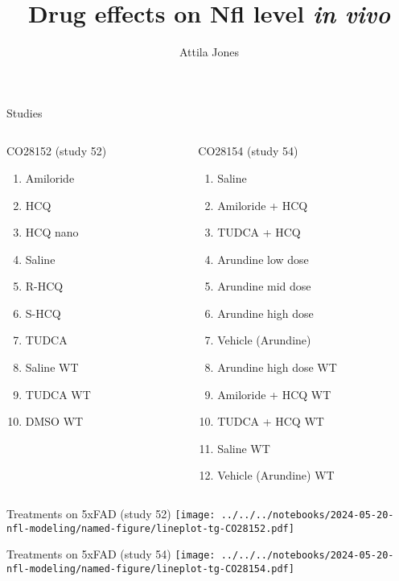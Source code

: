 \documentclass[aspectratio=169]{beamer}
\title{Drug effects on Nfl level \emph{in vivo}}
\subtitle{}
\author{Attila Jones}
\date{}
\begin{document}
\titlepage

\begin{frame}{Studies}
\begin{columns}[t]
\begin{column}{0.5\textwidth}
  CO28152 (study 52)
\begin{enumerate}
      \item Amiloride
      \item HCQ
      \item HCQ nano
      \item Saline
      \item R-HCQ
      \item S-HCQ
      \item TUDCA
      \item Saline WT
      \item TUDCA WT
      \item DMSO WT
\end{enumerate}
\end{column}
\begin{column}{0.5\textwidth}
  CO28154 (study 54)
\begin{enumerate}
  \item Saline
  \item Amiloride + HCQ
  \item TUDCA + HCQ
  \item Arundine low dose
  \item Arundine mid dose
  \item Arundine high dose
  \item Vehicle (Arundine)
  \item Arundine high dose WT
  \item Amiloride + HCQ WT
  \item TUDCA + HCQ WT
  \item Saline WT
  \item Vehicle (Arundine) WT
\end{enumerate}
\end{column}
\end{columns}
\end{frame}


\begin{frame}{Treatments on 5xFAD (study 52)}
  \texttt{[image: ../../../notebooks/2024-05-20-nfl-modeling/named-figure/lineplot-tg-CO28152.pdf]}
\end{frame}

\begin{frame}{Treatments on 5xFAD (study 54)}
  \texttt{[image: ../../../notebooks/2024-05-20-nfl-modeling/named-figure/lineplot-tg-CO28154.pdf]}
\end{frame}
\end{document}
